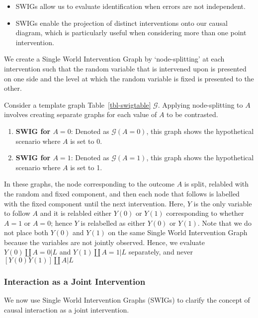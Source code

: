\documentclass[
  single column]{article}
\providecommand{\tightlist}{%
  \setlength{\itemsep}{0pt}\setlength{\parskip}{0pt}}\usepackage{longtable,booktabs,array}
\begin{document}
\begin{itemize}
\tightlist
\item
  SWIGs allow us to evaluate identification when errors are not
  independent.
\item
  SWIGs enable the projection of distinct interventions onto our causal
  diagram, which is particularly useful when considering more than one
  point intervention.
\end{itemize}

We create a Single World Intervention Graph by `node-splitting' at each
intervention such that the random variable that is intervened upon is
presented on one side and the level at which the random variable is
fixed is presented to the other.

Consider a template graph Table~\ref{tbl-swigtable} \(\mathcal{G}\).
Applying node-splitting to \(A\) involves creating separate graphs for
each value of \(A\) to be contrasted.

\begin{enumerate}
\def\labelenumi{\arabic{enumi}.}
\tightlist
\item
  \textbf{SWIG for \(A = 0\)}: Denoted as \(\mathcal{G}(A=0)\), this
  graph shows the hypothetical scenario where \(A\) is set to 0.
\item
  \textbf{SWIG for \(A = 1\)}: Denoted as \(\mathcal{G}(A=1)\), this
  graph shows the hypothetical scenario where \(A\) is set to 1.
\end{enumerate}

In these graphs, the node corresponding to the outcome \(A\) is split,
relabled with the random and fixed component, and then each node that
follows is labelled with the fixed component until the next
intervention. Here, \(Y\) is the only variable to follow \(A\) and it is
relabled either \(Y(0)\) or \(Y(1)\) corresponding to whether \(A=1\) or
\(A=0\); hence \(Y\) is relabelled as either \(Y(0)\) or \(Y(1)\). Note
that we do not place both \(Y(0)\) and \(Y(1)\) on the same Single World
Intervention Graph because the variables are not jointly observed.
Hence, we evaluate \(Y(0)\coprod A = 0| L\) and
\(Y(1)\coprod A = 1 | L\) separately, and never
\([Y(0) Y(1)] \coprod A | L\)

\subsubsection{Interaction as a Joint
Intervention}\label{interaction-as-a-joint-intervention}

We now use Single World Intervention Graphs (SWIGs) to clarify the
concept of causal interaction as a joint intervention.
\end{document}
